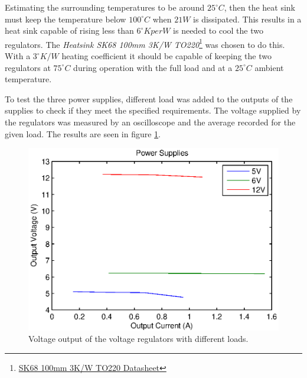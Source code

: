 Estimating the surrounding temperatures to be around $25^{\circ} C$, then the heat sink must keep the temperature below $100^{\circ} C$ when $21W$ is dissipated.
This results in a heat sink capable of rising less than $6 ^{\circ}K per W$ is needed to cool the two regulators.
The \textit{Heatsink SK68 100mm 3K/W TO220}\footnote{\href{http://dk.rs-online.com/web/p/koleplader/1898482/?searchTerm=Heatsink+SK68+100mm+3K\%2FW+TO220&relevancy-data=636F3D3226696E3D4931384E44656661756C74266C753D6461266D6D3D6D61746368616C6C7061727469616C26706D3D5E5B5C707B4C7D5C707B4E647D5C707B5A737D2D2C2F255C2E5D2B2426706F3D3926736E3D592673743D4B4559574F52445F4D554C54495F414C5048415F4E554D455249432673633D592677633D4E4F4E45267573743D4865617473696E6B20534B3638203130306D6D20334B2F5720544F32323026}{SK68 100mm 3K/W TO220 Datasheet}} was chosen to do this.
With a $3^{\circ}K/W$ heating coefficient it should be capable of keeping the two regulators at $75^{\circ}C$ during operation with the full load and at a $25^{\circ}C$ ambient temperature.



To test the three power supplies, different load was added to the outputs of the supplies to check if they meet the specified requirements.
The voltage supplied by the regulators was measured by an oscilloscope and the average recorded for the given load.
The results are seen in figure \ref{fig:voltagesupply}.

\begin{figure}[H]
\centering
\includegraphics[width = 0.9 \textwidth]{images/powersupply_output}
\caption{Voltage output of the voltage regulators with different loads.}
\label{fig:voltagesupply}
\end{figure}

